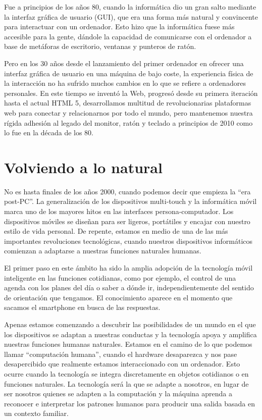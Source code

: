 Fue a principios de los años 80, cuando la informática dio un gran salto mediante la interfaz gráfica de usuario (GUI), que era una forma más natural y convincente para interactuar con un ordenador. Esto hizo que la informática fuese más accesible para la gente, dándole la capacidad de comunicarse con el ordenador a base de metáforas de escritorio, ventanas y punteros de ratón.

Pero en los 30 años desde el lanzamiento del primer ordenador en ofrecer una interfaz gráfica de usuario en una máquina de bajo coste, la experiencia física de la interacción no ha sufrido muchos cambios en lo que se refiere a ordenadores personales. En este tiempo se inventó la Web, progresó desde su primera iteración hasta el actual HTML 5, desarrollamos multitud de revolucionarias plataformas web para conectar y relacionarnos por todo el mundo, pero mantenemos nuestra rígida adhesión al legado del monitor, ratón y teclado a principios de 2010 como lo fue en la década de los 80. 

\section{Volviendo a lo natural}
No es hasta finales de los años 2000, cuando podemos decir que empieza la ``era post-PC''. La generalización de los dispositivos multi-touch y la informática móvil marca uno de los mayores hitos en las interfaces persona-computador. Los dispositivos móviles se diseñan para ser ligeros, portátiles y encajar con nuestro estilo de vida personal. De repente, estamos en medio de una de las más importantes revoluciones tecnológicas, cuando nuestros dispositivos informáticos comienzan a adaptarse a nuestras funciones naturales humanas.

El primer paso en este ámbito ha sido la amplia adopción de la tecnología móvil inteligente en las funciones cotidianas, como por ejemplo, el control de una agenda con los planes del día o saber a dónde ir, independientemente del sentido de orientación que tengamos. El conocimiento aparece en el momento que sacamos el smartphone en busca de las respuestas.

Apenas estamos comenzando a descubrir las posibilidades de un mundo en el que los dispositivos se adaptan a nuestras conductas y la tecnología apoya y amplifica nuestras funciones humanas naturales. Estamos en el camino de lo que podemos llamar ``computación humana'', cuando el hardware desaparezca y nos pase desapercibido que realmente estamos interaccionado con un ordenador. Esto ocurre cuando la tecnología se integra discretamente en objetos cotidianos o en funciones naturales. La tecnología será la que se adapte a nosotros, en lugar de ser nosotros quienes se adapten a la computación y la máquina aprenda a reconocer e interpretar los patrones humanos para producir una salida basada en un contexto familiar.

